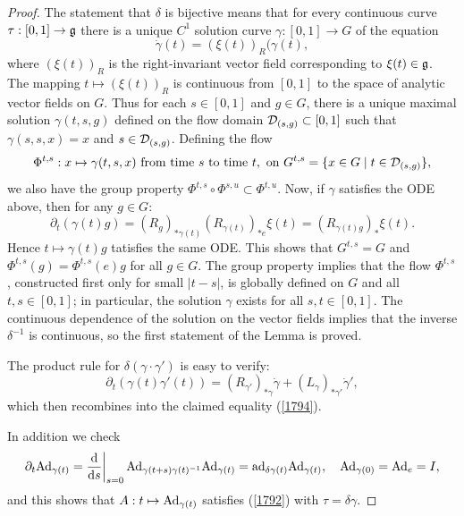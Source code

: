 \begin{proof}
    The statement that $\delta$ is bijective means that for every continuous curve $\tau:[0,1]\to\mathfrak{g}$ there is a unique $C^1$ solution curve $\gamma:[0,1]\to G$ of the equation
    \[\dot\gamma(t)=(\xi(t))_R(\gamma(t),\]
    where $(\xi(t))_R$ is the right-invariant vector field corresponding to $\xi(t)\in\mathfrak{g}$. The mapping $t\mapsto (\xi(t))_R$ is continuous from $[0,1]$ to the space of analytic vector fields on $G$. Thus for each $s\in[0,1]$ and $g\in G$, there is a unique maximal solution $\gamma(t,s,g)$ defined on the flow domain $\mathcal{D}_{(s,g)}\subset [0,1]$ such that $\gamma(s,s,x)=x$ and $s\in \mathcal{D}_{(s,g)}$. Defining the flow
    \[\Phi^{t,s}:x\mapsto \gamma(t,s,x)\text{ from time }s\text{ to time }t,\text{ on }G^{t,s}=\{x\in G\mid t\in \mathcal{D}_{(s,g)}\},\]
    we also have the group property $\Phi^{t,s}\circ \Phi^{s,u}\subset \Phi^{t,u}$. Now, if $\gamma$ satisfies the ODE above, then for any $g\in G$:
    \[\partial_t(\gamma(t)g)=\left(R_{g}\right)_{\ast \gamma(t)} \left(R_{\gamma(t)}\right)_{\ast e}\xi(t)=\left(R_{\gamma(t)g}\right)_{\ast}\xi(t).\]
    Hence $t\mapsto \gamma(t)g$ tatisfies the same ODE. This shows that $G^{t,s}=G$ and $\Phi^{t,s}(g)=\Phi^{t,s}(e)g$ for all $g\in G$. The group property implies that the flow $\Phi^{t,s}$, constructed first only for small $|t-s|$, is globally defined on $G$ and all $t,s\in[0,1]$; in particular, the solution $\gamma$ exists for all $s,t\in [0,1]$. The continuous dependence of the solution on the vector fields implies that the inverse $\delta^{-1}$ is continuous, so the first statement of the Lemma is proved.

    The product rule for $\delta(\gamma\cdot\gamma')$ is easy to verify:
    \[\partial_t(\gamma(t)\gamma'(t))=\left(R_{\gamma'}\right)_{\ast \gamma}\dot\gamma+ \left(L_{\gamma}\right)_{\ast \gamma'}\dot\gamma',\]
    which then recombines into the claimed equality (\ref{1794}).

    In addition we check 
    \[\partial_t \Ad_{\gamma(t)}=\restr{\frac{\dd}{\dd s}}{s=0}\Ad_{\gamma(t+s)\gamma(t)^{-1}}\Ad_{\gamma(t)}=\ad_{\delta \gamma(t)}\Ad_{\gamma(t)},\quad \Ad_{\gamma(0)}=\Ad_e=I,\]
    and this shows that $A:t\mapsto \mathrm{Ad}_{\gamma(t)}$ satisfies (\ref{1792}) with $\tau=\delta\gamma$.


\end{proof}
